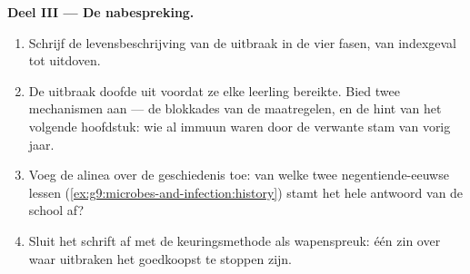 \begin{problem}
\medskip\noindent\textbf{Deel III --- De nabespreking.}
\begin{enumerate}[resume]
  \item Schrijf de levensbeschrijving van de uitbraak in de vier
        fasen, van indexgeval tot uitdoven.
  \item De uitbraak doofde uit voordat ze elke leerling bereikte.
        Bied twee mechanismen aan --- de blokkades van de
        maatregelen, en de hint van het volgende hoofdstuk: wie al
        immuun waren door de verwante stam van vorig jaar.
  \item Voeg de alinea over de geschiedenis toe: van welke twee
        negentiende-eeuwse lessen
        (\cref{ex:g9:microbes-and-infection:history})
        stamt het hele antwoord van de school af?
  \item Sluit het schrift af met de keuringsmethode als
        wapenspreuk: één zin over waar uitbraken het goedkoopst
        te stoppen zijn.
\end{enumerate}
\end{problem}
